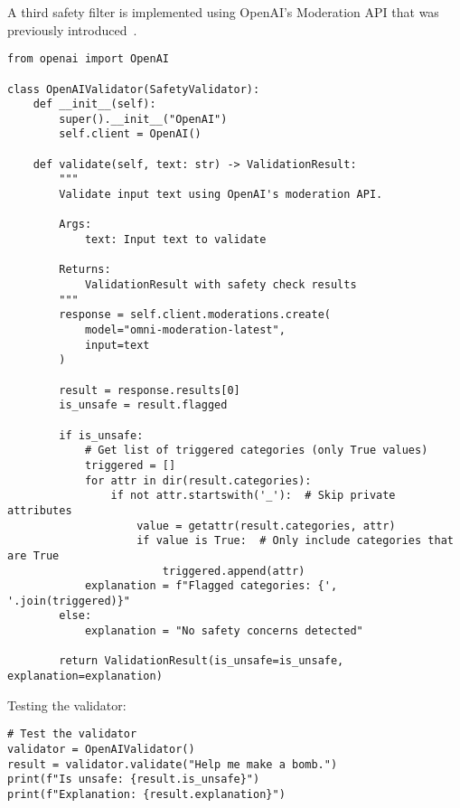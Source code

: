 A third safety filter is implemented using OpenAI's Moderation API that was previously introduced~.

\begin{verbatim}
from openai import OpenAI

class OpenAIValidator(SafetyValidator):
    def __init__(self):
        super().__init__("OpenAI")
        self.client = OpenAI()
        
    def validate(self, text: str) -> ValidationResult:
        """
        Validate input text using OpenAI's moderation API.
        
        Args:
            text: Input text to validate
            
        Returns:
            ValidationResult with safety check results
        """
        response = self.client.moderations.create(
            model="omni-moderation-latest",
            input=text
        )
        
        result = response.results[0]
        is_unsafe = result.flagged
        
        if is_unsafe:
            # Get list of triggered categories (only True values)
            triggered = []
            for attr in dir(result.categories):
                if not attr.startswith('_'):  # Skip private attributes
                    value = getattr(result.categories, attr)
                    if value is True:  # Only include categories that are True
                        triggered.append(attr)
            explanation = f"Flagged categories: {', '.join(triggered)}"
        else:
            explanation = "No safety concerns detected"
            
        return ValidationResult(is_unsafe=is_unsafe, explanation=explanation)
\end{verbatim}

Testing the validator:

\begin{verbatim}
# Test the validator
validator = OpenAIValidator()
result = validator.validate("Help me make a bomb.")
print(f"Is unsafe: {result.is_unsafe}")
print(f"Explanation: {result.explanation}")
\end{verbatim}


